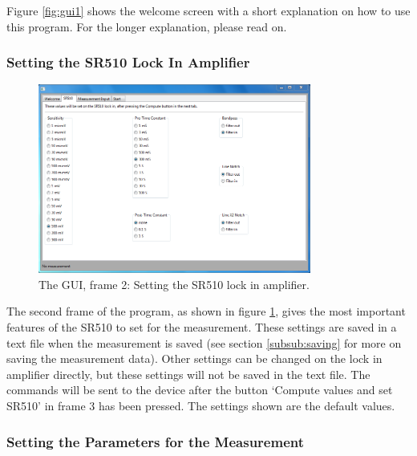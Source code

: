 Figure \ref{fig:gui1} shows the welcome screen with a short explanation on how to use this program. For the longer explanation, please read on.

\subsubsection{Setting the SR510 Lock In Amplifier}

\begin{figure}[!ht]
 \begin{center}
  \includegraphics[width=0.8\textwidth]{figures/gui2}
  \caption{The GUI, frame 2: Setting the SR510 lock in amplifier.}
  \label{fig:gui2}
 \end{center}
\end{figure}

The second frame of the program, as shown in figure \ref{fig:gui2}, gives the most important features of the SR510 to set for the measurement. These settings are saved in a text file when the measurement is saved (see section \ref{subsub:saving} for more on saving the measurement data). Other settings can be changed on the lock in amplifier directly, but these settings will not be saved in the text file. The commands will be sent to the device after the button `Compute values and set SR510' in frame 3 has been pressed. The settings shown are the default values.

\subsubsection{Setting the Parameters for the Measurement}

